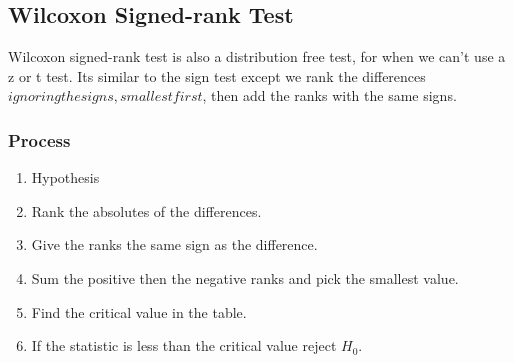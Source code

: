     \newpage
    \subsection{Wilcoxon Signed-rank Test}
    
        Wilcoxon signed-rank test is also a distribution free test, for when we can't use a z or t test. Its similar to the sign test except we rank the differences \(ignoring the signs, smallest first\), then add the ranks with the same signs.
        
        \subsubsection{Process}
            \begin{enumerate}
                \item Hypothesis
                \item Rank the absolutes of the differences.
                \item Give the ranks the same sign as the difference.
                \item Sum the positive then the negative ranks and pick the smallest value.
                \item Find the critical value in the table.
                \item If the statistic is less than the critical value reject $H_0$.
            \end{enumerate}
            
